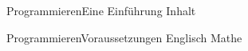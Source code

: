 


\begin{frame}{Programmieren}{Eine Einführung}
	Inhalt
\end{frame}

\begin{frame}{Programmieren}{Voraussetzungen}
	Englisch
	Mathe
\end{frame}

